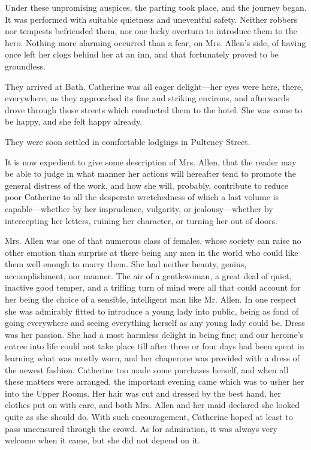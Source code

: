 Under these unpromising auspices, the parting took place, and the journey began. It was performed with suitable quietness and uneventful safety. Neither robbers nor tempests befriended them, nor one lucky overturn to introduce them to the hero. Nothing more alarming occurred than a fear, on Mrs. Allen's side, of having once left her clogs behind her at an inn, and that fortunately proved to be groundless.

They arrived at Bath. Catherine was all eager delight---her eyes were here, there, everywhere, as they approached its fine and striking environs, and afterwards drove through those streets which conducted them to the hotel. She was come to be happy, and she felt happy already.

They were soon settled in comfortable lodgings in Pulteney Street.

It is now expedient to give some description of Mrs. Allen, that the reader may be able to judge in what manner her actions will hereafter tend to promote the general distress of the work, and how she will, probably, contribute to reduce poor Catherine to all the desperate wretchedness of which a last volume is capable---whether by her imprudence, vulgarity, or jealousy---whether by intercepting her letters, ruining her character, or turning her out of doors.

Mrs. Allen was one of that numerous class of females, whose society can raise no other emotion than surprise at there being any men in the world who could like them well enough to marry them. She had neither beauty, genius, accomplishment, nor manner. The air of a gentlewoman, a great deal of quiet, inactive good temper, and a trifling turn of mind were all that could account for her being the choice of a sensible, intelligent man like Mr. Allen. In one respect she was admirably fitted to introduce a young lady into public, being as fond of going everywhere and seeing everything herself as any young lady could be. Dress was her passion. She had a most harmless delight in being fine; and our heroine's entree into life could not take place till after three or four days had been spent in learning what was mostly worn, and her chaperone was provided with a dress of the newest fashion. Catherine too made some purchases herself, and when all these matters were arranged, the important evening came which was to usher her into the Upper Rooms. Her hair was cut and dressed by the best hand, her clothes put on with care, and both Mrs. Allen and her maid declared she looked quite as she should do. With such encouragement, Catherine hoped at least to pass uncensured through the crowd. As for admiration, it was always very welcome when it came, but she did not depend on it.


